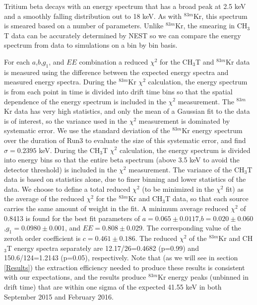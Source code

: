 Tritium beta decays with an energy spectrum that has a broad peak at 2.5 keV and a smoothly falling distribution out to 18 keV.  As with $^{83m}$Kr, this spectrum is smeared based on a number of parameters.  Unlike $^{83m}$Kr, the smearing in CH$_3$T data can be accurately determined by NEST so we can compare the energy spectrum from data to simulations on a bin by bin basis. 

For each $a$,$b$,$g_1$, and $EE$ combination a reduced $\chi^2$ for the CH$_3$T and $^{83m}$Kr data is measured using the difference between the expected energy spectra and measured energy spectra.   During the $^{83m}$Kr $\chi^2$ calculation, the energy spectrum is from each point in time is divided into drift time bins so that the spatial dependence of the energy spectrum is included in the $\chi^2$ measurement.  The $^{83m}$Kr data has very high statistics, and only the mean of a Gaussian fit to the data is of interest, so the variance used in the $\chi^2$  measurement  is dominated by systematic error.  We use the standard deviation of the $^{83m}$Kr energy spectrum over the duration of Run3 to evaluate the size of this systematic error, and find $\sigma = 0.2395$ keV.  During the CH$_3$T $\chi^2$  calculation, the energy spectrum is divided into energy bins so that the entire beta spectrum (above 3.5 keV to avoid the detector threshold) is included in the $\chi^2$ measurement.  The variance of the CH$_3$T data is based on statistics alone, due to finer binning and lower statistics of the data.  We choose to define a total reduced $\chi^2$ (to be minimized in the $\chi^2$ fit) as the average of the reduced $\chi^2$ for the $^{83m}$Kr and CH$_3$T data, so that each source carries the same amount of weight in the fit. A minimum average reduced  $\chi^2$ of 0.8413 is found for the best fit parameters of $a=0.065 \pm 0.0117$,$b=0.020 \pm 0.060$,$g_1=0.0980 \pm 0.001$, and $EE=0.808 \pm 0.029$. The corresponding value of the zeroth order coefficient is $c=0.461 \pm 0.186$.  The reduced $\chi^2$ of the $^{83m}$Kr and CH$_3$T energy spectra separately are 12.17/26=0.4682 (p=0.99) and 150.6/124=1.2143 (p=0.05), respectively. Note that (as we will see in section \ref{Results}) the extraction efficiency needed to produce these results is consistent with our expectations, and the results produce $^{83m}$Kr energy peaks (unbinned in drift time) that are within one sigma of the expected 41.55 keV in both September 2015 and February 2016. 


